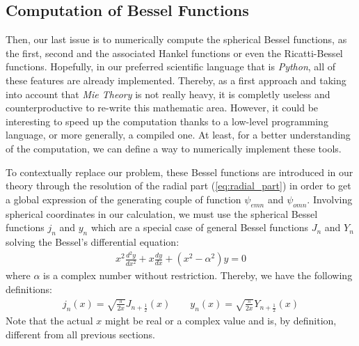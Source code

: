 \documentclass{article}
\numberwithin{equation}{section}
\begin{document}
\subsection{Computation of Bessel Functions}

Then, our last issue is to numerically compute the spherical Bessel functions, as the first, second and the associated Hankel functions or even the Ricatti-Bessel functions. Hopefully, in our preferred scientific language that is \textit{Python}, all of these features are already implemented. Thereby, as a first approach and taking into account that \textit{Mie Theory} is not really heavy, it is completly useless and counterproductive to re-write this mathematic area. However, it could be interesting to speed up the computation thanks to a low-level programming language, or more generally, a compiled one. At least, for a better understanding of the computation, we can define a way to numerically implement these tools.

To contextually replace our problem, these Bessel functions are introduced in our theory through the resolution of the radial part (\ref{eq:radial_part}) in order to get a global expression of the generating couple of function $\psi_{emn}$ and $\psi_{omn}$. Involving spherical coordinates in our calculation, we must use the spherical Bessel functions $j_{n}$ and $y_{n}$ which are a special case of general Bessel functions $J_{n}$ and $Y_{n}$ solving the Bessel's differential equation:
\begin{align}
x^{2}\frac{d^{2}y}{dx^{2}} + x\frac{dy}{dx} + (x^{2} - \alpha^{2})y = 0
\end{align}
where $\alpha$ is a complex number without restriction. Thereby, we have the following definitions:
\begin{align}
j_{n}(x)=\sqrt{\frac{\pi}{2x}}J_{n+\frac{1}{2}}(x) \qquad y_{n}(x)=\sqrt{\frac{\pi}{2x}}Y_{n+\frac{1}{2}}(x)
\end{align}
Note that the actual $x$ might be real or a complex value and is, by definition, different from all previous sections.
\end{document}
